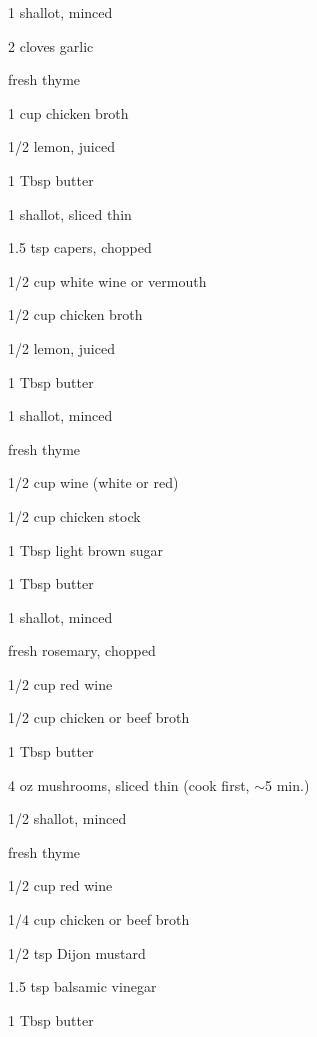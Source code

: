 \documentclass[oneside]{book}  %
\newcommand{\itemNL}{\item[] \hspace{-\labelsep}}  %
\newcommand{\about}{$\sim$}
\begin{document}
\begin{twocols}
  \begin{ingredients}
    \item[1] shallot, minced
    \item[2] cloves garlic
    \itemNL fresh thyme
    \item[1 cup] chicken broth
    \item[1/2] lemon, juiced
    \item[1 Tbsp] butter
  \end{ingredients}

  \begin{ingredients}
    \item[1] shallot, sliced thin
    \item[1.5 tsp] capers, chopped
    \item[1/2 cup] white wine or vermouth
    \item[1/2 cup] chicken broth
    \item[1/2] lemon, juiced
    \item[1 Tbsp] butter
  \end{ingredients}

  \begin{ingredients}
    \item[1] shallot, minced
    \itemNL fresh thyme
    \item[1/2 cup] wine (white or red)
    \item[1/2 cup] chicken stock
    \item[1 Tbsp] light brown sugar
    \item[1 Tbsp] butter
  \end{ingredients}

  \columnbreak

  \begin{ingredients}
    \item[1] shallot, minced
    \itemNL fresh rosemary, chopped
    \item[1/2 cup] red wine
    \item[1/2 cup] chicken or beef broth
    \item[1 Tbsp] butter
  \end{ingredients}

  \begin{ingredients}
    \item[4 oz] mushrooms, sliced thin (cook first, \about 5 min.)
    \item[1/2] shallot, minced
    \itemNL fresh thyme
    \item[1/2 cup] red wine
    \item[1/4 cup] chicken or beef broth
    \item[1/2 tsp] Dijon mustard
    \item[1.5 tsp] balsamic vinegar
    \item[1 Tbsp] butter
  \end{ingredients}


\end{twocols}
\end{document}
